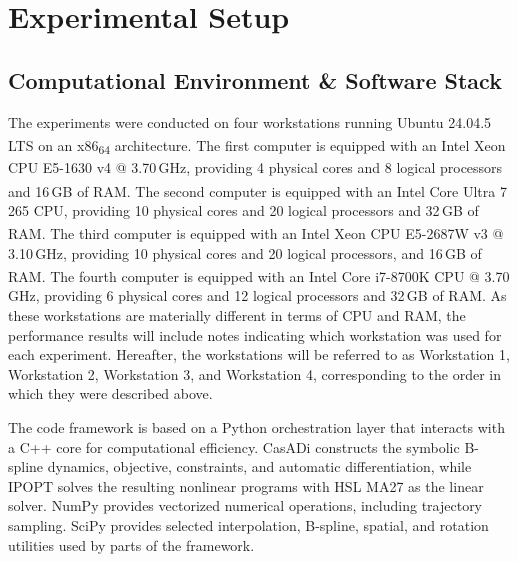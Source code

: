 \chapter{Experimental Setup}
\label{ch:experimental_setup}


\section{Computational Environment \& Software Stack}
\label{sec:setup_environment}

The experiments were conducted on four workstations running Ubuntu 24.04.5 LTS on an x86\textsubscript{64} architecture. 
The first computer is equipped with an Intel\textsuperscript{\textregistered} Xeon\textsuperscript{\textregistered} CPU E5-1630 v4 @ 3.70\,GHz, providing 4 physical cores and 8 logical processors and 16\,GB of RAM. 
The second computer is equipped with an Intel\textsuperscript{\textregistered} Core\textsuperscript{\texttrademark} Ultra 7 265 CPU, providing 10 physical cores and 20 logical processors and 32\,GB of RAM.
The third computer is equipped with an Intel\textsuperscript{\textregistered} Xeon\textsuperscript{\textregistered} CPU E5-2687W v3 @ 3.10\,GHz, providing 10 physical cores and 20 logical processors, and 16\,GB of RAM.
The fourth computer is equipped with an Intel\textsuperscript{\textregistered} Core\textsuperscript{\texttrademark} i7-8700K CPU @ 3.70\,GHz, providing 6 physical cores and 12 logical processors and 32\,GB of RAM.
As these workstations are materially different in terms of CPU and RAM, the performance results will include notes indicating which workstation was used for each experiment.
Hereafter, the workstations will be referred to as Workstation 1, Workstation 2, Workstation 3, and Workstation 4, corresponding to the order in which they were described above.

The code framework is based on a Python orchestration layer that interacts with a C++ core for computational efficiency. 
\ac{CasADi} constructs the symbolic B-spline dynamics, objective, constraints, and automatic differentiation, while \ac{IPOPT} solves the resulting nonlinear programs with HSL MA27 as the linear solver. 
NumPy provides vectorized numerical operations, including trajectory sampling. 
SciPy provides selected interpolation, B-spline, spatial, and rotation utilities used by parts of the framework. 

